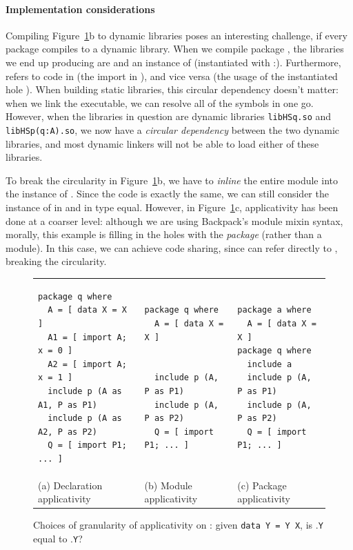 \documentclass{article}
\begin{document}
\paragraph{Implementation considerations}
Compiling Figure~\ref{fig:applicativity}b to dynamic libraries poses an
interesting challenge, if every package compiles to a dynamic library.
When we compile package , the libraries we end up producing are 
and an instance of  (instantiated with :).  Furthermore,
 refers to code in  (the import in ), and vice versa (the usage
of the instantiated hole ).  When building static libraries, this circular
dependency doesn't matter: when we link the executable, we can resolve all
of the symbols in one go.  However, when the libraries in question are
dynamic libraries \verb|libHSq.so| and \verb|libHSp(q:A).so|, we now have
a \emph{circular dependency} between the two dynamic libraries, and most dynamic
linkers will not be able to load either of these libraries.

To break the circularity in Figure~\ref{fig:applicativity}b, we have to \emph{inline}
the entire module  into the instance of .  Since the code is exactly
the same, we can still consider the instance of  in  and in 
type equal.  However, in Figure~\ref{fig:applicativity}c, applicativity has been
done at a coarser level: although we are using Backpack's module mixin syntax,
morally, this example is filling in the holes with the \emph{package} 
(rather than a module).  In this case, we can achieve code sharing, since
 can refer directly to , breaking the circularity.

    \begin{savenotes}
\begin{figure}
    \begin{tabular}{C C C}
\begin{verbatim}
package q where
  A = [ data X = X ]
  A1 = [ import A; x = 0 ]
  A2 = [ import A; x = 1 ]
  include p (A as A1, P as P1)
  include p (A as A2, P as P2)
  Q = [ import P1; ... ]
\end{verbatim}
&
\begin{verbatim}
package q where
  A = [ data X = X ]


  include p (A, P as P1)
  include p (A, P as P2)
  Q = [ import P1; ... ]
\end{verbatim}
&
\begin{verbatim}
package a where
  A = [ data X = X ]
package q where
  include a
  include p (A, P as P1)
  include p (A, P as P2)
  Q = [ import P1; ... ]
\end{verbatim}
  \\
  (a) Declaration applicativity  &
  (b) Module applicativity  &
  (c) Package applicativity  \\
\end{tabular}
\caption{Choices of granularity of applicativity on : given \texttt{data Y = Y X},  is .\texttt{Y} equal to .\texttt{Y}?}\label{fig:applicativity}
\end{figure}
\end{savenotes}
\end{document}
